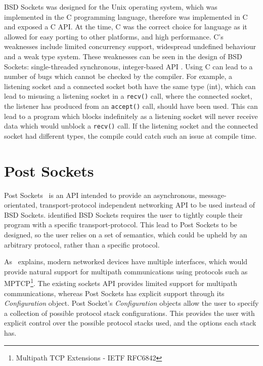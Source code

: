 BSD Sockets was designed for the Unix operating system, which was implemented in the C programming language, therefore
was implemented in C and exposed a C API.
At the time, C was the correct choice for language as it allowed for easy porting to other platforms, and high
performance.
C's weaknesses include limited concurrency support, widespread undefined behaviour and a weak type system.
These weaknesses can be seen in the design of BSD Sockets: single-threaded synchronous, integer-based API .
Using C can lead to a number of bugs which cannot be checked by the compiler.
For example, a listening socket and a connected socket both have the same type (int), which can lead to misusing a
listening socket in a \texttt{recv()} call, where the connected socket, the listener has produced from an
\texttt{accept()} call, should have been used.
This can lead to a program which blocks indefinitely as a listening socket will never receive data which would unblock
a \texttt{recv()} call.
If the listening socket and the connected socket had different types, the compile could catch such an issue at compile
time.

\section{Post Sockets}\label{sec:post-sockets}
Post Sockets~\citep{kuhlewind_postsocketsabstract_} is an API intended to provide an asynchronous, message-orientated,
transport-protocol independent networking API to be used instead of BSD Sockets.
\citet{kuhlewind_postsocketsabstract_} identified BSD Sockets requires the user to tightly couple their program with a
specific transport-protocol.
This lead to Post Sockets to be designed, so the user relies on a set of semantics, which could be upheld by an
arbitrary protocol, rather than a specific protocol.

As~\cite{kuhlewind_postsocketsabstract_} explains, modern networked devices have multiple interfaces, which would
provide natural support for multipath communications using protocols such as
MPTCP\footnote{Multipath TCP Extensions - IETF RFC6842}.
The existing sockets API provides limited support for multipath communications, whereas Post Sockets has explicit
support through its \emph{Configuration} object.
Post Socket's \emph{Configuration} objects allow the user to specify a collection of possible protocol stack
configurations.
This provides the user with explicit control over the possible protocol stacks used, and the options each stack has.

